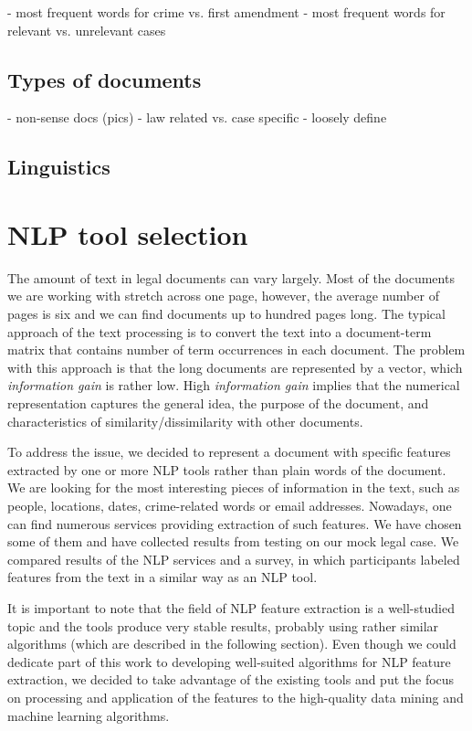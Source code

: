 \documentclass[
  digital, %
  table,   %
  lof,     %
  lot,     %
]{fithesis3}
\begin{document}
- most frequent words for crime vs. first amendment
- most frequent words for relevant vs. unrelevant cases

\section{Types of documents}
- non-sense docs (pics)
- law related vs. case specific - loosely define
\section{Linguistics}


\chapter{NLP tool selection}
The amount of text in legal documents can vary largely.
Most of the documents we are working with stretch across one page, however, the average number of pages is six and we can find documents up to hundred pages long.
The typical approach of the text processing is to convert the text into a document-term matrix that contains number of term occurrences in each document.
The problem with this approach is that the long documents are represented by a vector, which \emph{information gain} is rather low.
High \emph{information gain} implies that the numerical representation captures the general idea, the purpose of the document, and characteristics of similarity/dissimilarity with other documents.

To address the issue, we decided to represent a document with specific features extracted by one or more NLP tools rather than plain words of the document.
We are looking for the most interesting pieces of information in the text, such as people, locations, dates, crime-related words or email addresses.
Nowadays, one can find numerous services providing extraction of such features.
We have chosen some of them and have collected results from testing on our mock legal case.
We compared results of the NLP services and a survey, in which participants labeled features from the text in a similar way as an NLP tool.

It is important to note that the field of NLP feature extraction is a well-studied topic and the tools produce very stable results, probably using rather similar algorithms (which are described in the following section). Even though we could dedicate part of this work to developing well-suited algorithms for NLP feature extraction, we decided to take advantage of the existing tools and put the focus on processing and application of the features to the high-quality data mining and machine learning algorithms. 
\end{document}
